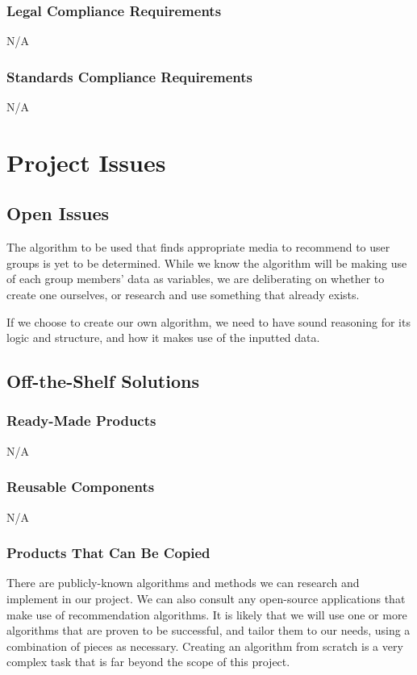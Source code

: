 \documentclass[12pt]{article}
\begin{document}
\subsubsection{Legal Compliance Requirements}
N/A

\subsubsection{Standards Compliance Requirements}
N/A

\section{Project Issues}


\subsection{Open Issues}

The algorithm to be used that finds appropriate media to recommend to user groups is yet to be determined. While we know the algorithm will be making use of each group members' data as variables, we are deliberating on whether to create one ourselves, or research and use something that already exists.

If we choose to create our own algorithm, we need to have sound reasoning for its logic and structure, and how it makes use of the inputted data.

\subsection{Off-the-Shelf Solutions}

\subsubsection{Ready-Made Products}
N/A

\subsubsection{Reusable Components}
N/A

\subsubsection{Products That Can Be Copied}
There are publicly-known algorithms and methods we can research and implement in our project. We can also consult any open-source applications that make use of recommendation algorithms. It is likely that we will use one or more algorithms that are proven to be successful, and tailor them to our needs, using a combination of pieces as necessary. Creating an algorithm from scratch is a very complex task that is far beyond the scope of this project.
\end{document}
